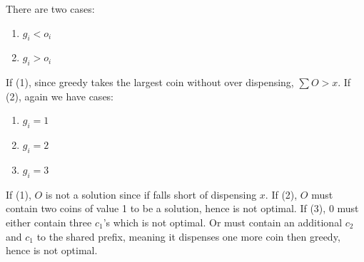 \documentclass{amsart}
\theoremstyle{definition}
\theoremstyle{remark}
\numberwithin{equation}{section}
\begin{document}
There are two cases:

\begin{enumerate}
  \item $g_i < o_i$
  \item $g_i > o_i$
\end{enumerate}

If (1), since greedy takes the largest coin without over dispensing, $\sum O > x$.
If (2), again we have cases:

\begin{enumerate}
  \item $g_i = 1$
  \item $g_i = 2$
  \item $g_i = 3$
\end{enumerate}

If (1), $O$ is not a solution since if falls short of dispensing $x$.
If (2), $O$ must contain two coins of value 1 to be a solution, hence is not optimal.
If (3), $0$ must either contain three $c_1$'s which is not optimal. Or must contain an
additional $c_2$ and $c_1$ to the shared prefix, meaning it dispenses one more
coin then greedy, hence is not optimal.
\end{document}
